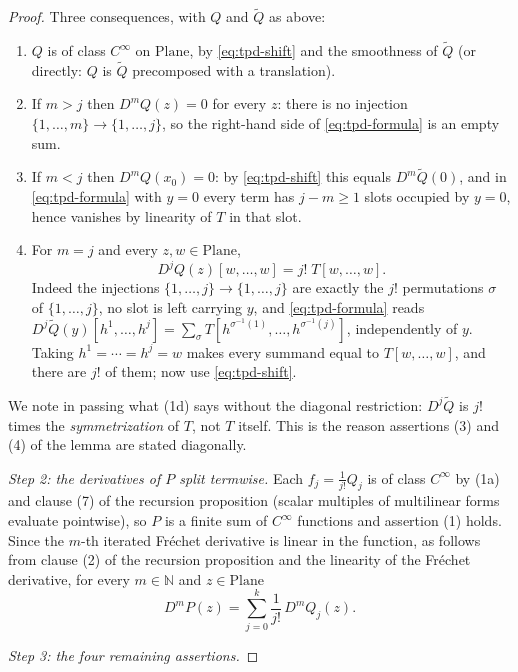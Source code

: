 \begin{proof}
Three consequences, with $Q$ and $\widetilde{Q}$ as above:
\begin{enumerate}
\item[(1a)] $Q$ is of class $C^{\infty}$ on $\mathrm{Plane}$, by \eqref{eq:tpd-shift} and the
smoothness of $\widetilde{Q}$ (or directly: $Q$ is $\widetilde{Q}$ precomposed with a
translation).
\item[(1b)] If $m>j$ then $D^{m}Q(z)=0$ for every $z$: there is no injection
$\{1,\ldots,m\}\to\{1,\ldots,j\}$, so the right-hand side of \eqref{eq:tpd-formula} is an
empty sum.
\item[(1c)] If $m<j$ then $D^{m}Q(x_0)=0$: by \eqref{eq:tpd-shift} this equals
$D^{m}\widetilde{Q}(0)$, and in \eqref{eq:tpd-formula} with $y=0$ every term has $j-m\ge1$
slots occupied by $y=0$, hence vanishes by linearity of $T$ in that slot.
\item[(1d)] For $m=j$ and every $z,w\in\mathrm{Plane}$,
\[
  D^{j}Q(z)[w,\ldots,w]=j!\;T[w,\ldots,w].
\]
Indeed the injections $\{1,\ldots,j\}\to\{1,\ldots,j\}$ are exactly the $j!$ permutations
$\sigma$ of $\{1,\ldots,j\}$, no slot is left carrying $y$, and \eqref{eq:tpd-formula} reads
$D^{j}\widetilde{Q}(y)[h^{1},\ldots,h^{j}]=\sum_{\sigma}T[h^{\sigma^{-1}(1)},\ldots,h^{\sigma^{-1}(j)}]$,
independently of $y$.  Taking $h^{1}=\cdots=h^{j}=w$ makes every summand equal to
$T[w,\ldots,w]$, and there are $j!$ of them; now use \eqref{eq:tpd-shift}.
\end{enumerate}
We note in passing what (1d) says without the diagonal restriction: $D^{j}\widetilde{Q}$ is
$j!$ times the \emph{symmetrization} of $T$, not $T$ itself.  This is the reason assertions (3)
and (4) of the lemma are stated diagonally.

\medskip\noindent\emph{Step 2: the derivatives of $P$ split termwise.}
Each $f_j=\frac{1}{j!}Q_j$ is of class $C^{\infty}$ by (1a) and clause (7) of the recursion
proposition (scalar multiples of multilinear forms evaluate pointwise), so $P$ is a finite sum
of $C^{\infty}$ functions and assertion (1) holds.  Since the $m$-th iterated Fr\'echet
derivative is linear in the function, as follows from clause (2) of the recursion proposition
and the linearity of the Fr\'echet derivative, for every $m\in\mathbb{N}$ and
$z\in\mathrm{Plane}$
\begin{equation}\label{eq:tpd-split}
  D^{m}P(z)=\sum_{j=0}^{k}\frac{1}{j!}\,D^{m}Q_j(z).
\end{equation}

\medskip\noindent\emph{Step 3: the four remaining assertions.}


\end{proof}
